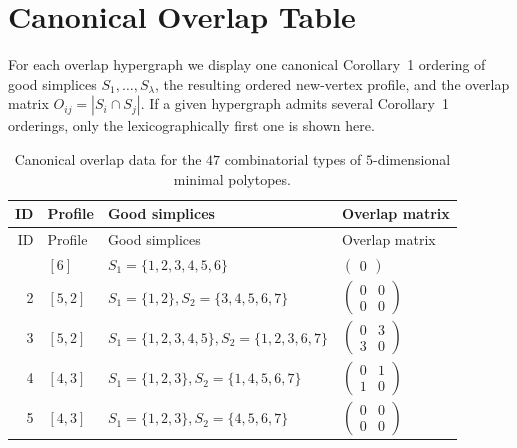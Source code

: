\section{Canonical Overlap Table}
\label{app:5d-structures}

For each overlap hypergraph we display one canonical Corollary~1 ordering
of good simplices $S_1,\dots,S_\lambda$, the resulting ordered new-vertex
profile, and the overlap matrix $O_{ij} = |S_i \cap S_j|$.  If a given
hypergraph admits several Corollary~1 orderings, only the lexicographically
first one is shown here.

\begingroup
\scriptsize
\setlength{\tabcolsep}{4pt}
\renewcommand{\arraystretch}{1.08}
\begin{longtable}{@{}r>{\raggedright\arraybackslash}p{1.5cm}>{\raggedright\arraybackslash}p{8.4cm}>{\raggedright\arraybackslash}p{4.2cm}@{}}
\caption{Canonical overlap data for the $47$ combinatorial types of $5$-dimensional minimal polytopes.}
\label{tab:5d-structures}\\
\toprule
ID & Profile & Good simplices & Overlap matrix \\
\midrule
\endfirsthead
\toprule
ID & Profile & Good simplices & Overlap matrix \\
\midrule
\endhead
\bottomrule
\endfoot
1 & $[6]$ & $S_{1}=\{1,2,3,4,5,6\}$ & $\left(\begin{smallmatrix}0\end{smallmatrix}\right)$ \\
2 & $[5,2]$ & $S_{1}=\{1,2\}, S_{2}=\{3,4,5,6,7\}$ & $\left(\begin{smallmatrix}0 & 0\\0 & 0\end{smallmatrix}\right)$ \\
3 & $[5,2]$ & $S_{1}=\{1,2,3,4,5\}, S_{2}=\{1,2,3,6,7\}$ & $\left(\begin{smallmatrix}0 & 3\\3 & 0\end{smallmatrix}\right)$ \\
4 & $[4,3]$ & $S_{1}=\{1,2,3\}, S_{2}=\{1,4,5,6,7\}$ & $\left(\begin{smallmatrix}0 & 1\\1 & 0\end{smallmatrix}\right)$ \\
5 & $[4,3]$ & $S_{1}=\{1,2,3\}, S_{2}=\{4,5,6,7\}$ & $\left(\begin{smallmatrix}0 & 0\\0 & 0\end{smallmatrix}\right)$ \\

\end{longtable}
